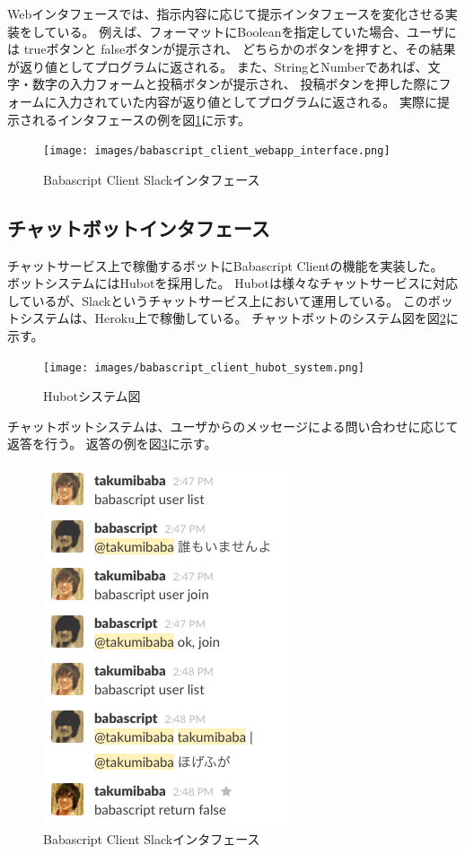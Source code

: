 Webインタフェースでは、指示内容に応じて提示インタフェースを変化させる実装をしている。
例えば、フォーマットにBooleanを指定していた場合、ユーザには trueボタンと
falseボタンが提示され、
どちらかのボタンを押すと、その結果が返り値としてプログラムに返される。
また、StringとNumberであれば、文字・数字の入力フォームと投稿ボタンが提示され、
投稿ボタンを押した際にフォームに入力されていた内容が返り値としてプログラムに返される。
実際に提示されるインタフェースの例を図\ref{fig:babascript_client_webapp_interface}に示す。

\begin{figure}[htbp]
  \begin{center}
  \texttt{[image: images/babascript\_client\_webapp\_interface.png]}
  \end{center}
  \caption{Babascript Client Slackインタフェース}
  \label{fig:babascript_client_webapp_interface}
\end{figure}

\subsection{チャットボットインタフェース}\label{ux30c1ux30e3ux30c3ux30c8ux30dcux30c3ux30c8ux30a4ux30f3ux30bfux30d5ux30a7ux30fcux30b9}

チャットサービス上で稼働するボットにBabascript Clientの機能を実装した。
ボットシステムにはHubotを採用した。
Hubotは様々なチャットサービスに対応しているが、Slackというチャットサービス上において運用している。
このボットシステムは、Heroku上で稼働している。
チャットボットのシステム図を図\ref{fig:babascript_client_hubot_system}に示す。

\begin{figure}[htbp]
  \begin{center}
  \texttt{[image: images/babascript\_client\_hubot\_system.png]}
  \end{center}
  \caption{Hubotシステム図}
  \label{fig:babascript_client_hubot_system}
\end{figure}

チャットボットシステムは、ユーザからのメッセージによる問い合わせに応じて返答を行う。
返答の例を図\ref{fig:babascript_client_slack}に示す。

\begin{figure}[htbp]
  \begin{center}
  \includegraphics[width=.3\linewidth,bb=0 0 273 402]{images/babascript_client_slack.png}
  \end{center}
  \caption{Babascript Client Slackインタフェース}
  \label{fig:babascript_client_slack}
\end{figure}

